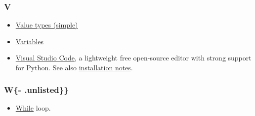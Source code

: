 \documentclass[
]{book}
\providecommand{\tightlist}{%
  \setlength{\itemsep}{0pt}\setlength{\parskip}{0pt}}
\begin{document}
\hypertarget{v}{%
\subsubsection*{V}\label{v}}

\begin{itemize}
\item
  \protect\hyperlink{value-types}{Value types (simple)}
\item
  \protect\hyperlink{variables}{Variables}
\item
  \href{https://code.visualstudio.com/}{Visual Studio Code}, a lightweight free open-source editor with strong support for Python. See also \protect\hyperlink{install-vs-code}{installation notes}.
\end{itemize}

\hypertarget{w--.unlisted}{%
\subsubsection{W\{- .unlisted\}\}}\label{w--.unlisted}}

\begin{itemize}
\tightlist
\item
  \protect\hyperlink{while-loop}{While} loop.
\end{itemize}
\end{document}
